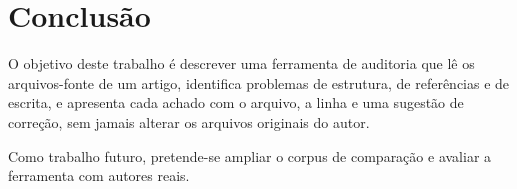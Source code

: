 \section{Conclusão}\label{sec:conclusao}

O objetivo deste trabalho é descrever uma ferramenta de auditoria que lê os
arquivos-fonte de um artigo, identifica problemas de estrutura, de referências
e de escrita, e apresenta cada achado com o arquivo, a linha e uma sugestão de
correção, sem jamais alterar os arquivos originais do autor.

Como trabalho futuro, pretende-se ampliar o corpus de comparação e avaliar a
ferramenta com autores reais.
